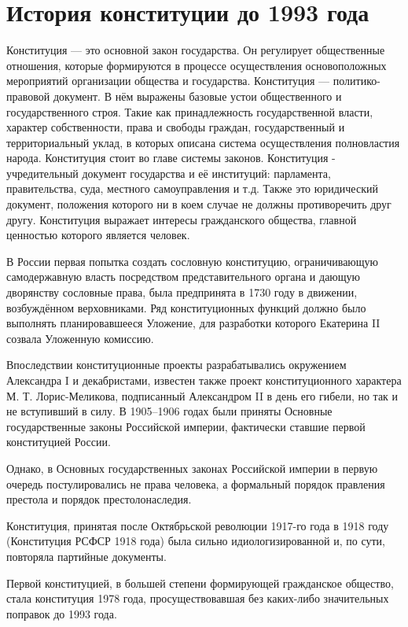 \documentclass[a4paper,12pt]{diss_4}
\begin{document}

\addtocounter{page}{1}

\tableofcontents

\chapter{История конституции до 1993 года}


Конституция --- это основной закон государства. Он регулирует общественные отношения, которые формируются в процессе осуществления основоположных мероприятий организации общества и государства. Конституция --- политико-правовой документ. В нём выражены базовые устои общественного и государственного строя. Такие как принадлежность государственной власти, характер собственности, права и свободы граждан, государственный и территориальный уклад, в которых описана система осуществления полновластия народа. Конституция стоит во главе системы законов. Конституция - учредительный документ государства и её институций: парламента, правительства, суда, местного самоуправления и т.д. Также это юридический документ, положения которого ни в коем случае не должны противоречить друг другу. Конституция выражает интересы  гражданского общества, главной ценностью которого является человек.

В России первая попытка создать сословную конституцию, ограничивающую самодержавную власть посредством представительного органа и дающую дворянству сословные права, была предпринята в 1730 году в движении, возбуждённом верховниками. Ряд конституционных функций должно было выполнять планировавшееся Уложение, для разработки которого Екатерина II созвала Уложенную комиссию.

Впоследствии конституционные проекты разрабатывались окружением Александра I и декабристами, известен также проект конституционного характера М. Т. Лорис-Меликова, подписанный Александром II в день его гибели, но так и не вступивший в силу. В 1905--1906 годах были приняты Основные государственные законы Российской империи, фактически ставшие первой конституцией России.

Однако, в Основных государственных законах Российской империи в первую очередь постулировались не права человека, а формальный порядок правления престола и порядок престолонаследия. 

Конституция, принятая после Октябрьской революции 1917-го года в 1918 году (Конституция РСФСР 1918 года) была сильно идиологизированной и, по сути, повторяла партийные документы.

Первой конституцией, в большей степени формирующей гражданское общество, стала конституция 1978 года, просуществовавшая без каких-либо значительных поправок до 1993 года.
\end{document}
